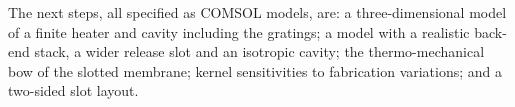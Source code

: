 The next steps, all specified as COMSOL models, are: a three-dimensional model of a finite heater and cavity including
the gratings; a model with a realistic back-end stack, a wider release slot and an isotropic cavity; the
thermo-mechanical bow of the slotted membrane; kernel sensitivities to fabrication variations; and a two-sided slot
layout.
